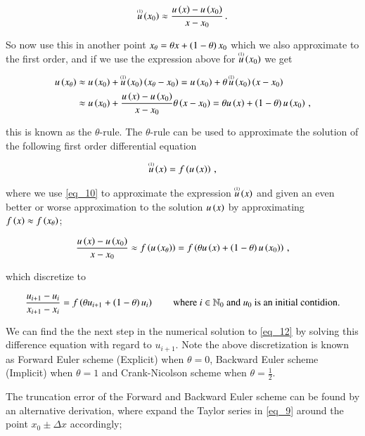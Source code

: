 \documentclass[11pt,english,a4paper]{article}
\begin{document}
\begin{flushleft}
\begin{align}
\T{u}{(1)}\p{x_0} \approx \frac{u\p{x}-u\p{x_0}}{x-x_0}\,.
\label{eq_10}
\end{align}

So now use this in another point $x_{\theta} = \theta x + \p{1-\theta}x_0$ which we also approximate to the first order, and if we use the expression above for $\T{u}{(1)}\p{x_0}$ we get

\begin{align}
u\p{x_\theta} &\approx u\p{x_0} + \T{u}{(1)}\p{x_0}\p{x_{\theta}-x_0} = u\p{x_0} + \theta\,\T{u}{(1)}\p{x_0}\p{x-x_0} 
\nonumber\\
&\approx u\p{x_0} + \frac{u\p{x}-u\p{x_0}}{x-x_0}\theta\p{x-x_0} = \theta u\p{x} + \p{1-\theta}u\p{x_0} \,,
\label{eq_11}
\end{align}

this is known as the $\theta$-rule. The $\theta$-rule can be used to approximate the solution of the following first order differential equation

\begin{align}
\T{u}{(1)}\p{x} = f\p{u\p{x}} \,,
\label{eq_12}
\end{align}

where we use \eqref{eq_10} to approximate the expression $\T{u}{(1)}\p{x}$ and given an even better or worse approximation to the solution $u\p{x}$ by approximating $f\p{x}\approx f\p{x_{\theta}}$;

\begin{align*}
\frac{u\p{x}-u\p{x_0}}{x-x_0} \approx f\p{u\p{x_{\theta}}} = f\p{\theta u\p{x} + \p{1-\theta}u\p{x_0}}\,,
\end{align*}

which discretize to

\begin{align}
\frac{u_{i+1}-u_i}{x_{i+1}-x_i} = f\p{\theta u_{i+1} + \p{1-\theta}u_i} \qquad \text{where } i\in\mathbb{N}_0 \text{ and $u_0$ is an initial contidion.} 
\label{eq_13}
\end{align}

We can find the the next step in the numerical solution to \eqref{eq_12} by solving this difference equation with regard to $u_{i+1}$. Note the above discretization is known as Forward Euler scheme (Explicit) when $\theta = 0$, Backward Euler scheme (Implicit) when $\theta = 1$ and Crank-Nicolson scheme when $\theta = \frac{1}{2}$. \linebreak

The truncation error of the Forward and Backward Euler scheme can be found by an alternative derivation, where expand the Taylor series in \eqref{eq_9} around the point $x_0\pm\Delta x$ accordingly;


\end{flushleft}
\end{document}
